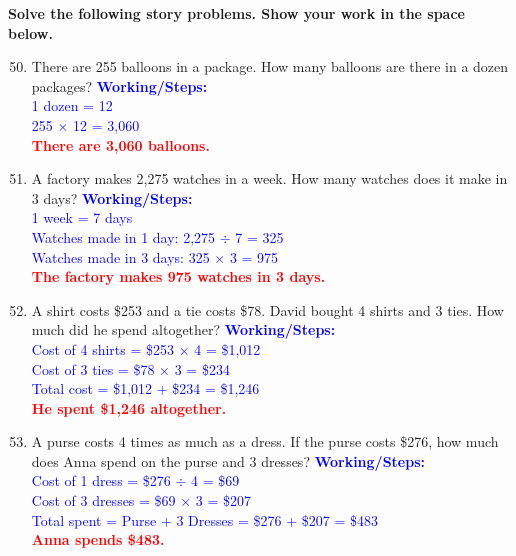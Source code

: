 \documentclass[11pt, a4paper]{article}
\newcommand{\answerline}[1]{\textcolor{red}{\textbf{#1}}}
\newcommand{\working}[1]{\vspace{10pt}\textcolor{blue}{\small \textbf{Working/Steps:}\\ #1}}
\begin{document}
\pagebreak

\textbf{Solve the following story problems. Show your work in the space below.}

\begin{enumerate}[label=\arabic*.]
    \setcounter{enumi}{49}
    \item There are 255 balloons in a package. How many balloons are there in a dozen packages?
    \working{1 dozen = 12 \\ 255 $\times$ 12 = 3,060 \\ \answerline{There are 3,060 balloons.}}

    \vspace{2cm}

    \item A factory makes 2,275 watches in a week. How many watches does it make in 3 days?
    \working{1 week = 7 days \\ Watches made in 1 day: 2,275 $\div$ 7 = 325 \\ Watches made in 3 days: 325 $\times$ 3 = 975 \\ \answerline{The factory makes 975 watches in 3 days.}}

    \vspace{2cm}

    \item A shirt costs \$253 and a tie costs \$78. David bought 4 shirts and 3 ties. How much did he spend altogether?
    \working{Cost of 4 shirts = \$253 $\times$ 4 = \$1,012 \\ Cost of 3 ties = \$78 $\times$ 3 = \$234 \\ Total cost = \$1,012 + \$234 = \$1,246 \\ \answerline{He spent \$1,246 altogether.}}

    \vspace{2cm}

    \item A purse costs 4 times as much as a dress. If the purse costs \$276, how much does Anna spend on the purse and 3 dresses?
    \working{Cost of 1 dress = \$276 $\div$ 4 = \$69 \\ Cost of 3 dresses = \$69 $\times$ 3 = \$207 \\ Total spent = Purse + 3 Dresses = \$276 + \$207 = \$483 \\ \answerline{Anna spends \$483.}}

\end{enumerate}

\pagebreak
\end{document}
